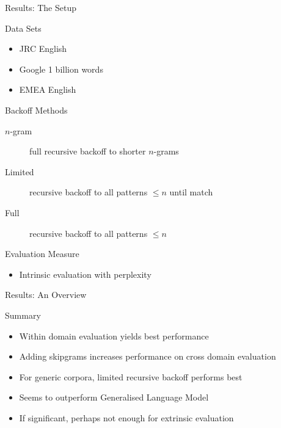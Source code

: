 \begin{frame}{Results: The Setup}
    \begin{block}{Data Sets}
        \begin{itemize}
            \item JRC English
            \item Google 1 billion words
            \item EMEA English
        \end{itemize}
    \end{block}

    \begin{block}{Backoff Methods}
        \begin{description}
            \item[$n$-gram] full recursive backoff to shorter $n$-grams
            \item[Limited] recursive backoff to all patterns $\leq n$ until match
            \item[Full] recursive backoff to all patterns $\leq n$
        \end{description}
    \end{block}

    \begin{block}{Evaluation Measure}
        \begin{itemize}
            \item Intrinsic evaluation with perplexity
        \end{itemize}
    \end{block}
\end{frame}
\note[itemize]{
}

\begin{frame}{Results: An Overview}
    \begin{block}{Summary}
        \begin{itemize}
            \item Within domain evaluation yields best performance
            \item Adding skipgrams increases performance on cross domain evaluation
            \item For generic corpora, limited recursive backoff performs best
            \item Seems to outperform Generalised Language Model
            \item If significant, perhaps not enough for extrinsic evaluation
        \end{itemize}
    \end{block}
\end{frame}
\note[itemize]{
}

